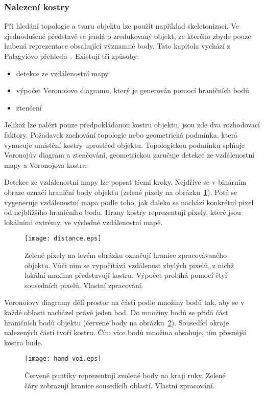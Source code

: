 \subsubsection{Nalezení kostry}
Při hledání topologie a tvaru objektu lze použít například skeletonizaci. Ve zjednodušené představě se jendá o zredukovaný objekt, ze kterého zbyde pouze hubená reprezentace obsahující významné body. Tato kapitola vychází z Palagyiovo přehledu~\cite{25}. Existují tři způsoby:

\begin{itemize}
\item detekce ze vzdálenostní mapy
\item výpočet Veronoiovo diagramu, který je generován pomocí hraničních bodů
\item ztenčení
\end{itemize}

Jelikož lze nalézt pouze předpokládanou kostru objektu, jsou zde dva rozhodovací faktory. Požadavek zachování topologie %
nebo geometrická podmínka, která vynucuje umístění kostry uprostřed objektu. Topologickou podmínku splňuje Voronojův diagram a ztenčování, geometrickou zaručuje detekce ze vzdálenostní mapy a Voronojova kostra.

Detekce ze vzdálenostní mapy lze popsat třemi kroky. Nejdříve se v binárním obraze označí hraniční body objektu (zelené pixely na obrázku~\ref{distance}). Poté se vygeneruje vzdálenostní mapa podle toho, jak daleko se nachází konkrétní pixel od nejbližšího hraničního bodu. Hrany kostry reprezentují pixely, které jsou lokálními extrémy, ve výsledné vzdálenostní mapě.
\begin{figure}[h]
\centering
\texttt{[image: distance.eps]}
\caption{Zelené pixely na levém obrázku označují hranice zpracovávaného objektu. Vůči nim se vypočítává vzdálenost zbylých pixelů, z nichž lokální maxima představují kostru. Výpočet probíhá pomocí čtyř sousedních pixelů. Vlastní zpracování.}
\label{distance}
\end{figure}

Voronoiovy diagramy dělí prostor na části podle množiny bodů tak, aby se v každé oblasti nacházel právě jeden bod. Do množiny bodů se přidá část hraničních bodů objektu (červené body na obrázku~\ref{picVoi}). Sousedící okraje nalezených částí tvoří kostru. Čím více bodů množina obsahuje, tím přesnější kostra bude.
\begin{figure}[h]
\centering
\texttt{[image: hand\_voi.eps]}
\caption{Červené puntíky reprezentují zvolené body na kraji ruky. Zelené čáry zobrazují hranice sousedícíh oblastí. Vlastní zpracování.}
\label{picVoi}
\end{figure}

